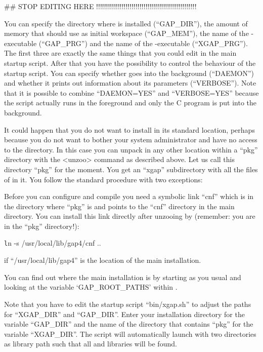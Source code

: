 \begintt
##  STOP EDITING HERE !!!!!!!!!!!!!!!!!!!!!!!!!!!!!!!!!!!!!!!!!!!!!!!!!!!
\endtt

You can specify the directory where {\GAP} is installed (``GAP\_DIR''), 
the amount of memory that {\GAP} should use as initial workspace
(``GAP\_MEM''), the name of the {\GAP}-executable (``GAP\_PRG'') and the
name of the {\XGAP}-executable (``XGAP\_PRG''). The first three are exactly 
the same things that you could edit in the main {\GAP} startup script.
After that you have the possibility to control the behaviour of the {\XGAP}
startup script. You can specify whether {\XGAP} goes into the background
(``DAEMON'') and whether it prints out information about its parameters
(``VERBOSE''). Note that it is possible to combine ``DAEMON=YES''
and ``VERBOSE=YES'' because the script actually runs in the foreground and
only the C program is put into the background.



It could happen that you do not want to install {\XGAP} in its
standard location, perhaps because you do not want to bother your
system administrator and have no access to the {\GAP} directory. In
this case you can unpack {\XGAP} in any other location within a
``pkg'' directory with the <unzoo> command as described above. Let us
call this directory ``pkg'' for the moment. You get an ``xgap''
subdirectory with all the files of {\XGAP} in it. You follow the
standard procedure with two exceptions:

Before you can configure and compile {\XGAP} you need a symbolic link
``cnf'' which is in the directory where ``pkg'' is and points to the ``cnf''
directory in the main {\GAP} directory. You can install this link directly
after unzooing by (remember: you are in the ``pkg'' directory!):

\texttt
ln -s /usr/local/lib/gap4/cnf ..
\endtt

if ``/usr/local/lib/gap4'' is the location of the main {\GAP} installation.

You can find out where the main {} installation is by starting 
{\GAP} as you usual and looking at the variable `GAP_ROOT_PATHS' 
within {\GAP}.

Note that you have to edit the startup script ``bin/xgap.sh'' to
adjust the paths for ``XGAP_DIR'' and ``GAP_DIR''.  Enter your {\GAP}
installation directory for the variable ``GAP_DIR'' and the name of
the directory that contains ``pkg'' for the variable ``XGAP_DIR''. The
script will automatically launch {\GAP} with two directories as
library path such that all {\GAP} and {\XGAP} libraries will be found.

